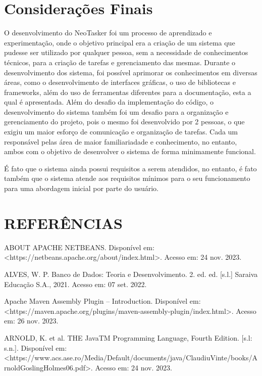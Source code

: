 \documentclass[a4paper,12pt]{article}
\begin{document}
\section{Considerações Finais}
O desenvolvimento do NeoTasker foi um processo de aprendizado e experimentação, onde o objetivo principal era a criação de um sistema que pudesse ser utilizado
por qualquer pessoa, sem a necessidade de conhecimentos técnicos, para a criação de tarefas e gerenciamento das mesmas. Durante o desenvolvimento dos sistema,
foi possível aprimorar os conhecimentos em diversas áreas, como o desenvolvimento de interfaces gráficas, o uso de bibliotecas e frameworks, além do uso de ferramentas 
diferentes para a documentação, esta a qual é apresentada. Além do desafio da implementação do código, o desenvolvimento do sistema também foi um desafio para a 
organização e gerenciamento do projeto, pois o mesmo foi desenvolvido por 2 pessoas, o que exigiu um maior esforço de comunicação e organização de tarefas. Cada um responsável 
pelas área de maior familiariadade e conhecimento, no entanto, ambos com o objetivo de desenvolver o sistema de forma minimamente funcional. 

É fato que o sistema ainda possui requisitos a serem atendidos, no entanto, é fato também que o sistema atende aos requisitos mínimos para o seu funcionamento para 
uma abordagem inicial por parte do usuário.

\pagebreak
\centering \section*{REFERÊNCIAS}
\vspace{1cm}

\raggedright
\noindent ABOUT APACHE NETBEANS. Disponível em: <https://netbeans.apache.org/about/index.html>. Acesso em: 24 nov. 2023. \linebreak

\noindent ALVES, W. P. Banco de Dados: Teoria e Desenvolvimento. 2. ed. ed. [s.l.] Saraiva Educação S.A., 2021. Acesso em: 07 set. 2022. \linebreak 

\noindent Apache Maven Assembly Plugin – Introduction. Disponível em: <https://maven.apache.org/plugins/maven-assembly-plugin/index.html>. 
Acesso em: 26 nov. 2023. \linebreak

\noindent ARNOLD, K. et al. THE JavaTM Programming Language, Fourth Edition. [s.l: s.n.]. 
Disponível em: <https://www.acs.ase.ro/Media/Default/documents/java/ClaudiuVinte/books/ArnoldGoslingHolmes06.pdf>. 
Acesso em: 24 nov. 2023. \linebreak
\end{document}
